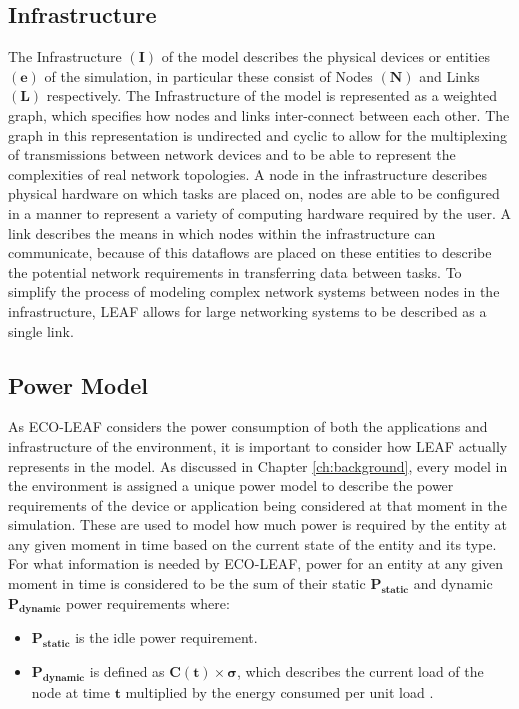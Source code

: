 \documentclass{l4proj}
\begin{document}
\subsection{Infrastructure}\label{subsec:infrastructure}
The Infrastructure $\mathbf{(I)}$ of the model describes the physical devices or entities $\mathbf{(e)}$ of the simulation, in particular these consist of Nodes $\mathbf{(N)}$ and Links $\mathbf{(L)}$ respectively.
The Infrastructure of the model is represented as a weighted graph, which specifies how nodes and links inter-connect between each other.
The graph in this representation is undirected and cyclic to allow for the multiplexing of transmissions between network devices and to be able to represent the complexities of real network topologies.
A node in the infrastructure describes physical hardware on which tasks are placed on, nodes are able to be configured in a manner to represent a variety of computing hardware required by the user.
A link describes the means in which nodes within the infrastructure can communicate, because of this dataflows are placed on these entities to describe the potential network requirements in transferring data between tasks.
To simplify the process of modeling complex network systems between nodes in the infrastructure, LEAF allows for large networking systems to be described as a single link.

\subsection{Power Model}\label{subsec:power-model}
As ECO-LEAF considers the power consumption of both the applications and infrastructure of the environment, it is important to consider how LEAF actually represents in the model.
As discussed in Chapter \ref{ch:background}, every model in the environment is assigned a unique power model to describe the power requirements of the device or application being considered at that moment in the simulation.
These are used to model how much power is required by the entity at any given moment in time based on the current state of the entity and its type.
For what information is needed by ECO-LEAF, power for an entity at any given moment in time is considered to be the sum of their static $\mathbf{P_{static}}$ and dynamic $\mathbf{P_{dynamic}}$ power requirements where:
\begin{itemize}
    \item $\mathbf{P_{static}}$ is the idle power requirement.\\
    \item $\mathbf{P_{dynamic}}$ is defined as $\mathbf{C(t) \times \sigma}$, which describes the current load of the node at time $\mathbf{t}$ multiplied by the energy consumed per unit load \citep{leaf2021}.
\end{itemize}
\end{document}
